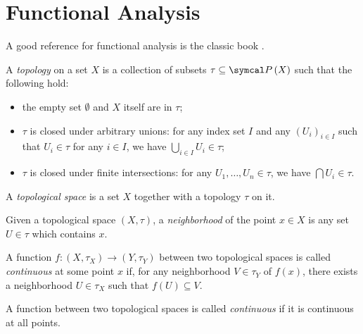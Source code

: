 \chapter{Functional Analysis}

A good reference for functional analysis is the classic book \cite{ReedSimon1972}.

\begin{definition}[Topology]
A \emph{topology} on a set \(X\) is a collection of subsets \(\tau \subseteq \powerset{X}\) such that the following hold:
\begin{itemize}
    \item the empty set \(\emptyset\) and \(X\) itself are in \(\tau\);
    \item \(\tau\) is closed under arbitrary unions: for any index set \(I\) and any \(\left(U_i\right)_{i \in I}\) such that \(U_i \in \tau\) for any \(i \in I\), we have \(\bigcup_{i \in I} U_i \in \tau\);
    \item \(\tau\) is closed under finite intersections: for any \(U_1, \dots, U_n \in \tau\), we have \(\bigcap U_i \in \tau\).
\end{itemize}
\end{definition}

\begin{definition}
A \emph{topological space} is a set \(X\) together with a topology \(\tau\) on it.
\end{definition}

\begin{definition}[Neighborhood]
Given a topological space \(\left(X, \tau\right)\), a \emph{neighborhood} of the point \(x \in X\) is any set \(U \in \tau\) which contains \(x\).
\end{definition}

\begin{definition}
A function \(f \colon \left(X, \tau_X\right) \to \left(Y, \tau_Y\right)\) between two topological spaces is called \emph{continuous} at some point \(x\) if, for any neighborhood \(V \in \tau_Y\) of \(f(x)\), there exists a neighborhood \(U \in \tau_X\) such that \(f(U) \subseteq V\).
\end{definition}

\begin{definition}
A function between two topological spaces is called \emph{continuous} if it is continuous at all points.
\end{definition}

